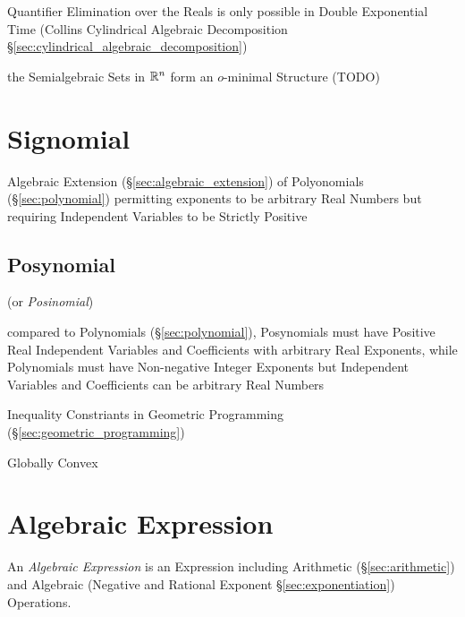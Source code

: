 Quantifier Elimination over the Reals is only possible in Double Exponential
Time (Collins Cylindrical Algebraic Decomposition
\S\ref{sec:cylindrical_algebraic_decomposition})

the Semialgebraic Sets in $\mathbb{R}^n$ form an $o$-minimal Structure (TODO)



\section{Signomial}\label{sec:signomial}

Algebraic Extension (\S\ref{sec:algebraic_extension}) of Polyonomials
(\S\ref{sec:polynomial}) permitting exponents to be arbitrary Real Numbers but
requiring Independent Variables to be Strictly Positive



\subsection{Posynomial}\label{sec:posynomial}

(or \emph{Posinomial})

compared to Polynomials (\S\ref{sec:polynomial}), Posynomials must have Positive
Real Independent Variables and Coefficients with arbitrary Real Exponents, while
Polynomials must have Non-negative Integer Exponents but Independent Variables
and Coefficients can be arbitrary Real Numbers

Inequality Constriants in Geometric Programming
(\S\ref{sec:geometric_programming})

Globally Convex



\section{Algebraic Expression}\label{sec:algebraic_expression}

An \emph{Algebraic Expression} is an Expression including Arithmetic
(\S\ref{sec:arithmetic}) and Algebraic (Negative and Rational Exponent
\S\ref{sec:exponentiation}) Operations.

